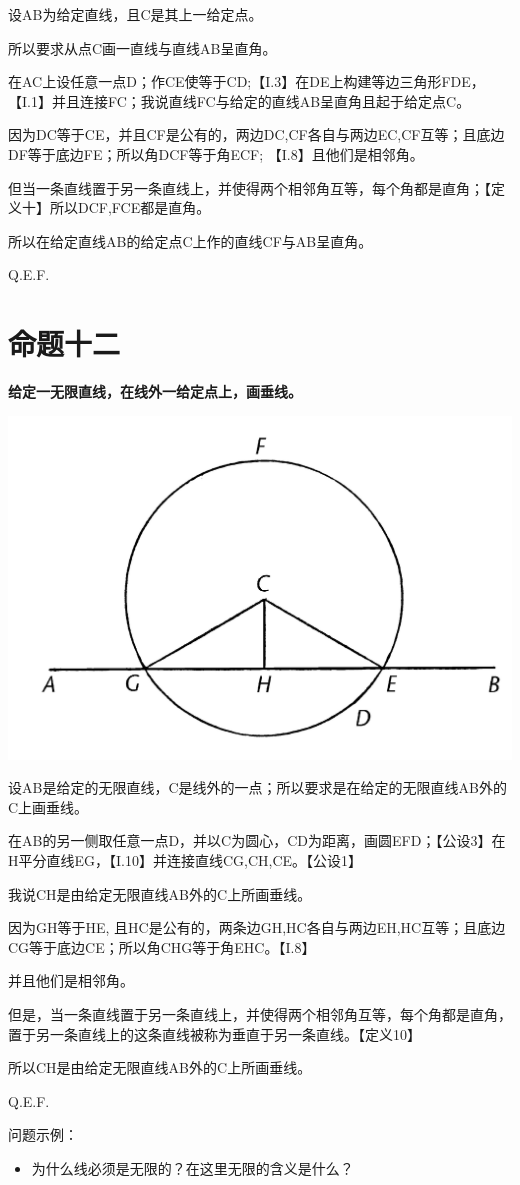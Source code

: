 \documentclass[
]{book}
\providecommand{\tightlist}{%
  \setlength{\itemsep}{0pt}\setlength{\parskip}{0pt}}
\begin{document}
设AB为给定直线，且C是其上一给定点。

所以要求从点C画一直线与直线AB呈直角。

在AC上设任意一点D；作CE使等于CD;【I.3】在DE上构建等边三角形FDE，【I.1】并且连接FC；我说直线FC与给定的直线AB呈直角且起于给定点C。

因为DC等于CE，并且CF是公有的，两边DC,CF各自与两边EC,CF互等；且底边DF等于底边FE；所以角DCF等于角ECF; 【I.8】且他们是相邻角。

但当一条直线置于另一条直线上，并使得两个相邻角互等，每个角都是直角；【定义十】所以DCF,FCE都是直角。

所以在给定直线AB的给定点C上作的直线CF与AB呈直角。

Q.E.F.

\hypertarget{ux547dux9898ux5341ux4e8c}{%
\section{命题十二}\label{ux547dux9898ux5341ux4e8c}}

\textbf{给定一无限直线，在线外一给定点上，画垂线。}

\includegraphics[width=0.4\linewidth]{./image/img473}

设AB是给定的无限直线，C是线外的一点；所以要求是在给定的无限直线AB外的C上画垂线。

在AB的另一侧取任意一点D，并以C为圆心，CD为距离，画圆EFD；【公设3】在H平分直线EG，【I.10】并连接直线CG,CH,CE。【公设1】

我说CH是由给定无限直线AB外的C上所画垂线。

因为GH等于HE, 且HC是公有的，两条边GH,HC各自与两边EH,HC互等；且底边CG等于底边CE；所以角CHG等于角EHC。【I.8】

并且他们是相邻角。

但是，当一条直线置于另一条直线上，并使得两个相邻角互等，每个角都是直角，置于另一条直线上的这条直线被称为垂直于另一条直线。【定义10】

所以CH是由给定无限直线AB外的C上所画垂线。

Q.E.F.

问题示例：

\begin{itemize}
\tightlist
\item
  为什么线必须是无限的？在这里无限的含义是什么？
\end{itemize}
\end{document}
